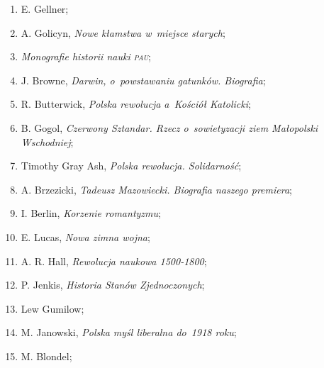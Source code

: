 \documentclass[a4paper,11pt]{article}
\begin{document}
\begin{enumerate}
\item E. Gellner;



\item A. Golicyn, \textit{Nowe kłamstwa w~miejsce starych};



\item \textit{Monografie historii nauki \textsc{pau}};



\item J. Browne, \textit{Darwin, o~powstawaniu gatunków. Biografia};



\item R. Butterwick, \textit{Polska rewolucja a~Kościół Katolicki};



\item B. Gogol, \textit{Czerwony Sztandar. Rzecz o~sowietyzacji ziem
    Małopolski Wschodniej};



\item Timothy Gray Ash, \textit{Polska rewolucja. Solidarność};



\item A. Brzezicki, \textit{Tadeusz Mazowiecki. Biografia naszego
    premiera};



\item I. Berlin, \textit{Korzenie romantyzmu};



\item E. Lucas, \textit{Nowa zimna wojna};



\item A. R. Hall, \textit{Rewolucja naukowa 1500-1800};



\item P. Jenkis, \textit{Historia Stanów Zjednoczonych};



\item Lew Gumilow;



\item M. Janowski, \textit{Polska myśl liberalna do~1918 roku};



\item M. Blondel;




\end{enumerate}
\end{document}
